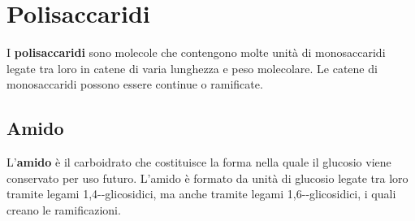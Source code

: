 \section{Polisaccaridi}\label{sec:polisaccaridi}
I \textbf{polisaccaridi} sono molecole che contengono molte unità di monosaccaridi legate tra loro in catene di varia lunghezza e peso molecolare. Le catene di monosaccaridi possono essere continue o ramificate.


\subsection{Amido}
L'\textbf{amido} è il carboidrato che costituisce la forma nella quale il glucosio viene conservato per uso futuro. L'amido è formato da unità di glucosio legate tra loro tramite legami 1,4-\a-glicosidici, ma anche tramite legami 1,6-\a-glicosidici, i quali creano le ramificazioni.


